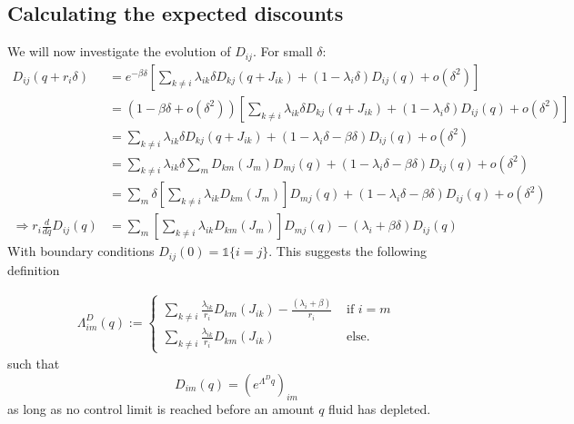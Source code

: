 \subsection{Calculating the expected discounts}
We will now investigate the evolution of $D_{ij}$. For small $\delta$:
\begin{equation}
\begin{split}
D_{ij}(q+r_i\delta)&=e^{-\beta\delta}\left[\sum\limits_{k\neq i}\lambda_{ik}\delta D_{kj}(q+J_{ik})+(1-\lambda_i\delta)D_{ij}(q)+o(\delta^2)\right]\\
&=(1-\beta\delta+o(\delta^2))\left[\sum\limits_{k\neq i}\lambda_{ik}\delta D_{kj}(q+J_{ik})+(1-\lambda_i\delta)D_{ij}(q)+o(\delta^2)\right]\\
&=\sum\limits_{k\neq i}\lambda_{ik}\delta D_{kj}(q+J_{ik})+(1-\lambda_i\delta-\beta\delta)D_{ij}(q)+o(\delta^2)\\
&=\sum\limits_{k\neq i}\lambda_{ik}\delta \sum\limits_mD_{km}(J_{m})D_{mj}(q)+(1-\lambda_i\delta-\beta\delta)D_{ij}(q)+o(\delta^2)\\
&=\sum\limits_m\delta\left[\sum\limits_{k\neq i}\lambda_{ik}D_{km}(J_{m})\right] D_{mj}(q)+(1-\lambda_i\delta-\beta\delta)D_{ij}(q)+o(\delta^2)\\
\Rightarrow r_i\frac{d}{dq}D_{ij}(q)&=\sum\limits_m\left[\sum\limits_{k\neq i}\lambda_{ik}D_{km}(J_{m})\right] D_{mj}(q)-(\lambda_i+\beta\delta)D_{ij}(q)
\end{split}
\end{equation}
With boundary conditions $D_{ij}(0)=\mathds{1}\{i=j\}$.
This suggests the following definition

\begin{equation}
\begin{split}
\Lambda^D_{im}(q):=\begin{cases}
\sum\limits_{k\neq i}\frac{\lambda_{ik}}{r_i}D_{km}(J_{ik})-\frac{(\lambda_i+\beta)}{r_i}&\text{ if }i=m\\
\sum\limits_{k\neq i}\frac{\lambda_{ik}}{r_i}D_{km}(J_{ik})&\text{ else.}
\end{cases}
\end{split}
\end{equation}
such that
\begin{equation}
D_{im}(q)=\left(e^{\Lambda^D q}\right)_{im}
\end{equation}
as long as no control limit is reached before an amount $q$ fluid has depleted.


